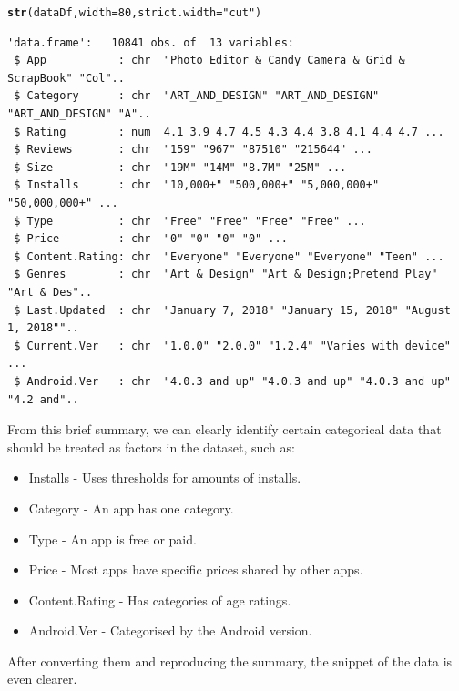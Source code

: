 \documentclass[12pt]{report}\usepackage[]{graphicx}\usepackage[]{xcolor}
\makeatletter
\newcommand{\hlnum}[1]{\textcolor[rgb]{0.686,0.059,0.569}{#1}}%
\newcommand{\hlstr}[1]{\textcolor[rgb]{0.192,0.494,0.8}{#1}}%
\newcommand{\hlstd}[1]{\textcolor[rgb]{0.345,0.345,0.345}{#1}}%
\newcommand{\hlkwc}[1]{\textcolor[rgb]{0.333,0.667,0.333}{#1}}%
\newcommand{\hlkwd}[1]{\textcolor[rgb]{0.737,0.353,0.396}{\textbf{#1}}}%
\newenvironment{kframe}{%
 \def\at@end@of@kframe{}%
 \ifinner\ifhmode%
  \def\at@end@of@kframe{\end{minipage}}%
  \begin{minipage}{\columnwidth}%
 \fi\fi%
 \def\FrameCommand##1{\hskip\@totalleftmargin \hskip-\fboxsep
 \colorbox{shadecolor}{##1}\hskip-\fboxsep
     \hskip-\linewidth \hskip-\@totalleftmargin \hskip\columnwidth}%
 \MakeFramed {\advance\hsize-\width
   \@totalleftmargin\z@ \linewidth\hsize
   \@setminipage}}%
 {\par\unskip\endMakeFramed%
 \at@end@of@kframe}
\newenvironment{knitrout}{}{} %
\makeatother
\begin{document}
    
\begin{knitrout}\footnotesize
{}\color{fgcolor}\begin{kframe}
\begin{alltt}
\hlkwd{str}\hlstd{(dataDf,} \hlkwc{width} \hlstd{=} \hlnum{80}\hlstd{,} \hlkwc{strict.width} \hlstd{=} \hlstr{"cut"}\hlstd{)}
\end{alltt}
\begin{verbatim}
'data.frame':	10841 obs. of  13 variables:
 $ App           : chr  "Photo Editor & Candy Camera & Grid & ScrapBook" "Col"..
 $ Category      : chr  "ART_AND_DESIGN" "ART_AND_DESIGN" "ART_AND_DESIGN" "A"..
 $ Rating        : num  4.1 3.9 4.7 4.5 4.3 4.4 3.8 4.1 4.4 4.7 ...
 $ Reviews       : chr  "159" "967" "87510" "215644" ...
 $ Size          : chr  "19M" "14M" "8.7M" "25M" ...
 $ Installs      : chr  "10,000+" "500,000+" "5,000,000+" "50,000,000+" ...
 $ Type          : chr  "Free" "Free" "Free" "Free" ...
 $ Price         : chr  "0" "0" "0" "0" ...
 $ Content.Rating: chr  "Everyone" "Everyone" "Everyone" "Teen" ...
 $ Genres        : chr  "Art & Design" "Art & Design;Pretend Play" "Art & Des"..
 $ Last.Updated  : chr  "January 7, 2018" "January 15, 2018" "August 1, 2018""..
 $ Current.Ver   : chr  "1.0.0" "2.0.0" "1.2.4" "Varies with device" ...
 $ Android.Ver   : chr  "4.0.3 and up" "4.0.3 and up" "4.0.3 and up" "4.2 and"..
\end{verbatim}
\end{kframe}
\end{knitrout}
From this brief summary, we can clearly identify certain categorical data that should
be treated as factors in the dataset, such as:
\begin{itemize}
    \item Installs - Uses thresholds for amounts of installs.
    \item Category - An app has one category.
    \item Type - An app is free or paid.
    \item Price - Most apps have specific prices shared by other apps.
    \item Content.Rating - Has categories of age ratings.
    \item Android.Ver - Categorised by the Android version.
\end{itemize} 

After converting them and reproducing the summary, the snippet of the data is even clearer.
\end{document}
